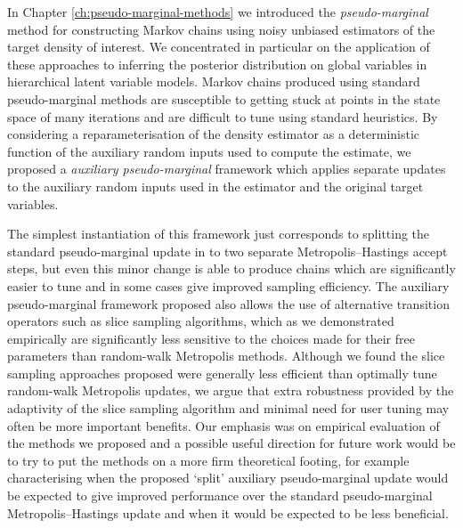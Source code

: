 In Chapter \ref{ch:pseudo-marginal-methods} we introduced the \emph{pseudo-marginal} method for constructing Markov chains using noisy unbiased estimators of the target density of interest. We concentrated in particular on the application of these approaches to inferring the posterior distribution on global variables in hierarchical latent variable models. Markov chains produced using standard pseudo-marginal methods are susceptible to getting stuck at points in the state space of many iterations and are difficult to tune using standard heuristics. By considering a reparameterisation of the density estimator as a deterministic function of the auxiliary random inputs used to compute the estimate, we proposed a \emph{auxiliary pseudo-marginal} framework which applies separate updates to the auxiliary random inputs used in the estimator and the original target variables. 

The simplest instantiation of this framework just corresponds to splitting the standard pseudo-marginal update in to two separate Metropolis--Hastings accept steps, but even this minor change is able to produce chains which are significantly easier to tune and in some cases give improved sampling efficiency. The auxiliary pseudo-marginal framework proposed also allows the use of alternative transition operators such as slice sampling algorithms, which as we demonstrated empirically are significantly less sensitive to the choices made for their free parameters than random-walk Metropolis methods. Although we found the slice sampling approaches proposed were generally less efficient than optimally tune random-walk Metropolis updates, we argue that extra robustness provided by the adaptivity of the slice sampling algorithm and minimal need for user tuning may often be more important benefits. Our emphasis was on empirical evaluation of the methods we proposed and a possible useful direction for future work would be to try to put the methods on a more firm theoretical footing, for example characterising when the proposed `split' auxiliary pseudo-marginal update would be expected to give improved performance over the standard pseudo-marginal Metropolis--Hastings update and when it would be expected to be less beneficial.

